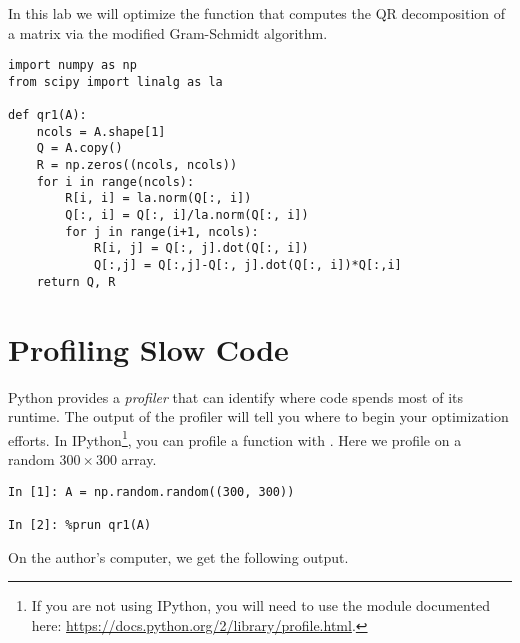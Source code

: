 \label{lab:ProfilingCode}

In this lab we will optimize the function  that computes the QR decomposition of a matrix via the modified Gram-Schmidt algorithm.

\begin{lstlisting}
import numpy as np
from scipy import linalg as la

def qr1(A):
    ncols = A.shape[1]
    Q = A.copy()
    R = np.zeros((ncols, ncols))
    for i in range(ncols):
        R[i, i] = la.norm(Q[:, i])
        Q[:, i] = Q[:, i]/la.norm(Q[:, i])
        for j in range(i+1, ncols):
            R[i, j] = Q[:, j].dot(Q[:, i])
            Q[:,j] = Q[:,j]-Q[:, j].dot(Q[:, i])*Q[:,i]
    return Q, R
\end{lstlisting}

\section*{Profiling Slow Code} %

Python provides a \emph{profiler} that can identify where code spends most of its runtime.
The output of the profiler will tell you where to begin your optimization efforts.
In IPython\footnote{If you are not using IPython, you will need to use the  module documented here: \url{https://docs.python.org/2/library/profile.html}.}, you can profile a function with .
Here we profile  on a random $300 \times 300$ array.

\begin{lstlisting}
In [1]: A = np.random.random((300, 300))

In [2]: %prun qr1(A)
\end{lstlisting}

On the author's computer, we get the following output.

